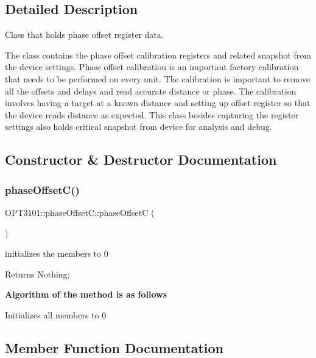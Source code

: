 \subsection{Detailed Description}
Class that holds phase offset register data. 

The class contains the phase offset calibration registers and related snapshot from the device settings. Phase offset calibration is an important factory calibration that needs to be performed on every unit. The calibration is important to remove all the offsets and delays and read accurate distance or phase. The calibration involves having a target at a known distance and setting up offset register so that the device reads distance as expected. This class besides capturing the register settings also holds critical snapshot from device for analysis and debug. 

\subsection{Constructor \& Destructor Documentation}
\mbox{\label{class_o_p_t3101_1_1phase_offset_c_af565b7d9f3261f8e9fc51c08a2f7339a}} 
\subsubsection{\texorpdfstring{phase\+Offset\+C()}{phaseOffsetC()}}
{\footnotesize\ttfamily O\+P\+T3101\+::phase\+Offset\+C\+::phase\+OffsetC (\begin{DoxyParamCaption}{ }\end{DoxyParamCaption})}



initializes the members to 0 

\begin{DoxyReturn}{Returns}
Nothing; 
\end{DoxyReturn}
{\bfseries Algorithm of the method is as follows}


\begin{DoxyItemize}
\item Initializes all members to 0 
\end{DoxyItemize}

\subsection{Member Function Documentation}
\mbox{\label{class_o_p_t3101_1_1phase_offset_c_ad6eeb78005b21ce0bd248829ae510045}} 
